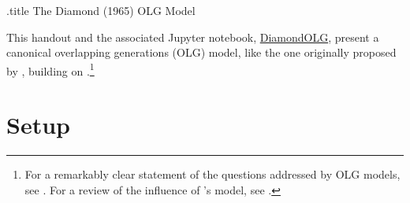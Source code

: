 \documentclass{handout}
\begin{document}
\handoutHeader

\begin{verbatimwrite}{\jobname.title}
The Diamond (1965) OLG Model
\end{verbatimwrite}

\handoutNameMake

This handout and the associated Jupyter notebook, \href{https://econ-ark.org/materials/diamondolg?launch}{DiamondOLG}, present a canonical overlapping generations (OLG) model, like the one originally proposed by \cite{diamond:olg}, building on \cite{samuelson:olg}.\footnote{For a remarkably clear statement of the questions addressed by OLG models, see \cite{jeffersonOLG}.  For a review of the influence of \cite{samuelson:olg}'s model, see \cite{weilSamuelson}.}

\section{Setup}
\end{document}

